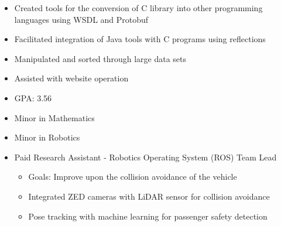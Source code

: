 \documentclass[10pt,a4paper,ragged2e,withhyper]{altacv}
\begin{document}
\begin{paracol}{2}
            \begin{itemize}
                \item Created tools for the conversion of C library into
                other programming languages using WSDL and Protobuf
                \item Facilitated integration of Java tools with C programs using reflections
            \end{itemize}
            \begin{itemize}
                \item Manipulated and sorted through large data sets
                \item Assisted with website operation
            \end{itemize}
        
            \begin{itemize}
                \item GPA: 3.56
                \item Minor in Mathematics
                \item Minor in Robotics
            \end{itemize}
        
            \begin{itemize}
                \item Paid Research Assistant - Robotics Operating System (ROS) Team Lead
                	\begin{itemize}
               			 \item Goals: Improve upon the collision avoidance of the vehicle
                              \item Integrated ZED cameras with LiDAR sensor for collision avoidance
                              \item Pose tracking with machine learning for passenger safety detection
            		\end{itemize}
            \end{itemize}
            \divider
            

\end{paracol}
\end{document}
